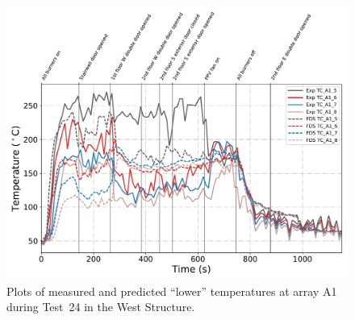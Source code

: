 \begin{figure}[!h]
	\centering
	\includegraphics[width=\columnwidth]{Figures/Plots/Validation/Temperature/Test_24_TC_A1_lower}
	\caption{Plots of measured and predicted ``lower'' temperatures at array A1 during Test~24 in the West Structure.}
	\label{fig:TCA1_lower_data_Test24}
\end{figure}

